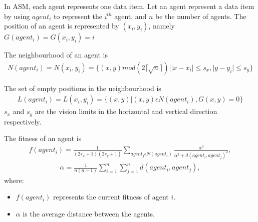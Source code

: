 \begin{definition}
In ASM, each agent represents one data item.
Let an agent represent a data item by using  \begin{math}   agent _{i}   \end{math} to represent the \begin{math}   i^{th}     \end{math} agent, and $n$ be the number of agents. The position of an agent is represented by  \begin{math} (x_i,y_i) \end{math}, namely \begin{math} G(agent_i)=G(x_i,y_i)=i   \end{math}
\end{definition}

\begin{definition} 
The  neighbourhood of an agent is
\begin{align}  
N(agent_i)=N(x_i,y_i)=\{(x,y) mod (2\lceil \sqrt{n} \rceil ) | \mid x-x_i \mid \leq s_x ,   \mid y-y_i \mid \leq s_y \}   
\end{align}
\end{definition}

\begin{definition}
The set of empty positions in the neighbourhood is
\begin{align}  
L(agent_i)=L(x_i,y_i)=\{(x,y) | (x,y) \epsilon N(agent_i), G(x,y)=0 \}    
\end{align}
\begin{math}  s_x  \end{math} and \begin{math}  s_y  \end{math} are the vision limits in the horizontal and vertical direction respectively.
\end{definition}

\begin{definition}
The fitness of an agent is
\begin{align}  
f(agent_i)=\frac{1}{(2s_x + 1) (2s_y + 1)} \sum_{agent_j \epsilon N(agent_i)} \frac{\alpha^2}{\alpha^2+d(agent_i,agent_j)^2},
\end{align}  
\begin{align}
\alpha=\frac{1}{n(n-1)} \sum_{i=1}^{n} \sum_{j=1}^{n} d(agent_i,agent_j),
\end{align}  
where:\\
\begin{itemize}
\item $f(agent_i)$ represents the current fitness of agent $i$.
\item $\alpha$ is  the average distance between the agents. 
\end{itemize}
\end{definition}

